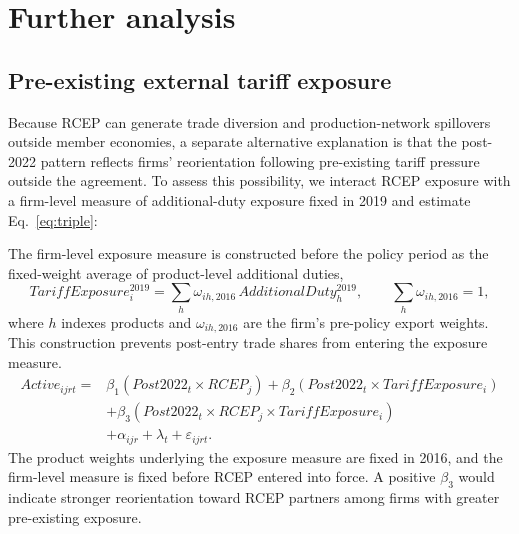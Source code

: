 \documentclass[preprint,12pt,authoryear]{elsarticle}
\begin{document}


\section{Further analysis}
\label{sec:further}

\subsection{Pre-existing external tariff exposure}

Because RCEP can generate trade diversion and production-network spillovers outside member economies, a separate alternative explanation is that the post-2022 pattern reflects firms' reorientation following pre-existing tariff pressure outside the agreement. To assess this possibility, we interact RCEP exposure with a firm-level measure of additional-duty exposure fixed in 2019 and estimate Eq.~\eqref{eq:triple}:

The firm-level exposure measure is constructed before the policy period as the
fixed-weight average of product-level additional duties,
\begin{equation}
\label{eq:tariff_exposure}
TariffExposure_i^{2019}
=\sum_h \omega_{ih,2016}\,AdditionalDuty_h^{2019},
\qquad \sum_h\omega_{ih,2016}=1,
\end{equation}
where $h$ indexes products and $\omega_{ih,2016}$ are the firm's pre-policy
export weights. This construction prevents post-entry trade shares from entering
the exposure measure.
\begin{equation}
\label{eq:triple}
\begin{aligned}
Active_{ijrt}={}&\beta_1(Post2022_t\times RCEP_j)+\beta_2(Post2022_t\times TariffExposure_i)\\
&+\beta_3(Post2022_t\times RCEP_j\times TariffExposure_i)\\
&+\alpha_{ijr}+\lambda_t+\varepsilon_{ijrt}.
\end{aligned}
\end{equation}
The product weights underlying the exposure measure are fixed in 2016, and the firm-level measure is fixed before RCEP entered into force. A positive $\beta_3$ would indicate stronger reorientation toward RCEP partners among firms with greater pre-existing exposure.
\end{document}
